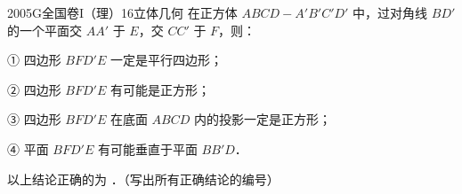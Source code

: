 
\begin{problem}{2005}{G}{全国卷I（理）}{16}{立体几何}
在正方体 $ ABCD-A'B'C'D' $ 中，过对角线 $ BD' $ 的一个平面交 $ AA' $ 于 $ E $，交 $ CC' $ 于 $ F $，则：

① 四边形 $BFD'E$ 一定是平行四边形；

② 四边形 $BFD'E$ 有可能是正方形；

③ 四边形 $BFD'E$ 在底面 $ ABCD $ 内的投影一定是正方形；

④ 平面 $BFD'E$ 有可能垂直于平面 $ BB'D $．

以上结论正确的为 \underline{\hspace{4em}}．（写出所有正确结论的编号）
\end{problem}

\begin{answer}

\end{answer}

\begin{solutions}

\end{solutions}